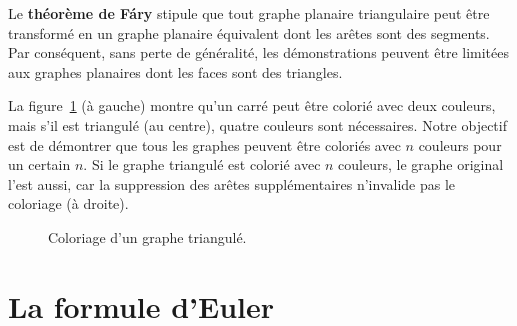 \begin{advanced}
Le {\bf théorème de F\'{a}ry} stipule que tout graphe planaire triangulaire peut être transformé en un graphe planaire équivalent dont les arêtes sont des segments. Par conséquent, sans perte de généralité, les démonstrations peuvent être limitées aux graphes planaires dont les faces sont des triangles.
\end{advanced}

\begin{example}
La figure~\ref{f.five-triangular-graph} (à gauche) montre qu'un carré peut être colorié avec deux couleurs, mais s'il est triangulé (au centre), quatre couleurs sont nécessaires. Notre objectif est de démontrer que tous les graphes peuvent être coloriés avec $n$ couleurs pour un certain $n$. Si le graphe triangulé est colorié avec $n$ couleurs, le graphe original l'est aussi, car la suppression des arêtes supplémentaires n'invalide pas le coloriage (à droite).
\end{example}

\begin{figure}[htbp]
\centering
{}
\caption{Coloriage d'un graphe triangulé.}
\label{f.five-triangular-graph}
\end{figure}

\section{La formule d'Euler}\label{s.euler}

